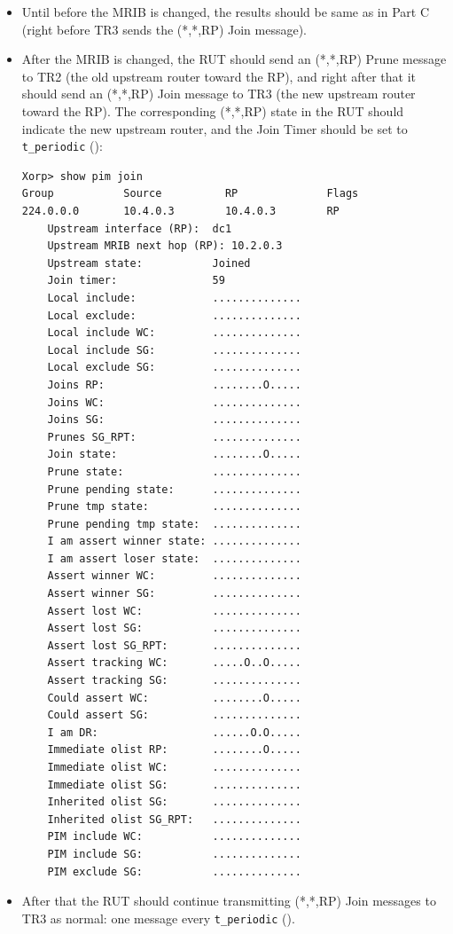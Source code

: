 \documentclass[11pt]{report}
\begin{document}
\begin{itemize}

  \item Until before the MRIB is changed, the results should
  be same as in Part C (right before TR3 sends the (*,*,RP) Join message).

  \item After the MRIB is changed, the RUT should send an (*,*,RP) Prune
  message to TR2 (the old upstream router toward the RP), and right after that
  it should send an (*,*,RP) Join message to TR3 (the new upstream router
  toward the RP). The corresponding (*,*,RP) state in the RUT should
  indicate the new upstream router, and the Join Timer should be set
  to \verb=t_periodic= ({\PimsmTPeriodic}):

\begin{verbatim}
Xorp> show pim join 
Group           Source          RP              Flags
224.0.0.0       10.4.0.3        10.4.0.3        RP   
    Upstream interface (RP):  dc1
    Upstream MRIB next hop (RP): 10.2.0.3
    Upstream state:           Joined 
    Join timer:               59
    Local include:            ..............
    Local exclude:            ..............
    Local include WC:         ..............
    Local include SG:         ..............
    Local exclude SG:         ..............
    Joins RP:                 ........O.....
    Joins WC:                 ..............
    Joins SG:                 ..............
    Prunes SG_RPT:            ..............
    Join state:               ........O.....
    Prune state:              ..............
    Prune pending state:      ..............
    Prune tmp state:          ..............
    Prune pending tmp state:  ..............
    I am assert winner state: ..............
    I am assert loser state:  ..............
    Assert winner WC:         ..............
    Assert winner SG:         ..............
    Assert lost WC:           ..............
    Assert lost SG:           ..............
    Assert lost SG_RPT:       ..............
    Assert tracking WC:       .....O..O.....
    Assert tracking SG:       ..............
    Could assert WC:          ........O.....
    Could assert SG:          ..............
    I am DR:                  ......O.O.....
    Immediate olist RP:       ........O.....
    Immediate olist WC:       ..............
    Immediate olist SG:       ..............
    Inherited olist SG:       ..............
    Inherited olist SG_RPT:   ..............
    PIM include WC:           ..............
    PIM include SG:           ..............
    PIM exclude SG:           ..............
\end{verbatim}

  \item After that the RUT should continue transmitting 
  (*,*,RP) Join messages to TR3 as normal: one message every \verb=t_periodic=
  ({\PimsmTPeriodic}).

\end{itemize}
\end{document}

